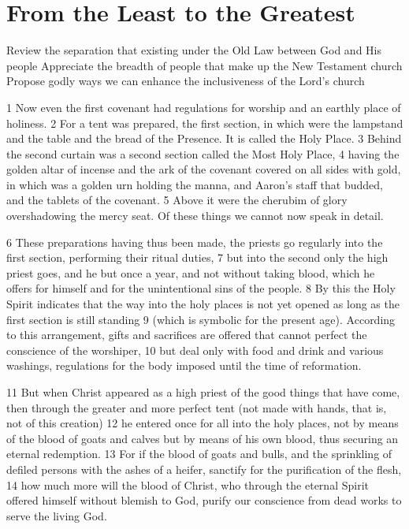 \chapter{From the Least to the Greatest}

\begin{goals}
\goal Review the separation that existing under the Old Law between God and His people 
\goal Appreciate the breadth of people that make up the New Testament church
\goal Propose godly ways we can enhance the inclusiveness of the Lord's church
\end{goals}

\begin{bible}

1 Now even the first covenant had regulations for worship and an earthly place of holiness. 2 For a tent was prepared, the first section, in which were the lampstand and the table and the bread of the Presence. It is called the Holy Place. 3 Behind the second curtain was a second section called the Most Holy Place, 4 having the golden altar of incense and the ark of the covenant covered on all sides with gold, in which was a golden urn holding the manna, and Aaron's staff that budded, and the tablets of the covenant. 5 Above it were the cherubim of glory overshadowing the mercy seat. Of these things we cannot now speak in detail.

6 These preparations having thus been made, the priests go regularly into the first section, performing their ritual duties, 7 but into the second only the high priest goes, and he but once a year, and not without taking blood, which he offers for himself and for the unintentional sins of the people. 8 By this the Holy Spirit indicates that the way into the holy places is not yet opened as long as the first section is still standing 9 (which is symbolic for the present age). According to this arrangement, gifts and sacrifices are offered that cannot perfect the conscience of the worshiper, 10 but deal only with food and drink and various washings, regulations for the body imposed until the time of reformation.

11 But when Christ appeared as a high priest of the good things that have come, then through the greater and more perfect tent (not made with hands, that is, not of this creation) 12 he entered once for all into the holy places, not by means of the blood of goats and calves but by means of his own blood, thus securing an eternal redemption. 13 For if the blood of goats and bulls, and the sprinkling of defiled persons with the ashes of a heifer, sanctify for the purification of the flesh, 14 how much more will the blood of Christ, who through the eternal Spirit offered himself without blemish to God, purify our conscience from dead works to serve the living God.


\end{bible}

